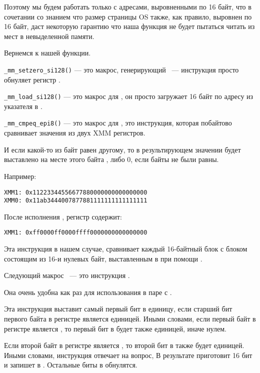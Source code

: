 Поэтому мы будем работать только с адресами, выровненными по 16 байт, что в сочетании со знанием 
что размер страницы \ac{OS} также, как правило, выровнен по 16 байт, 
даст некоторую гарантию что наша функция не будет пытаться читать из мест в невыделенной памяти.

Вернемся к нашей функции.

\verb|_mm_setzero_si128()| --- это макрос, генерирующий  ~--- инструкция просто обнуляет регистр .

\verb|_mm_load_si128()| --- это макрос для \MOVDQA, он просто загружает 16 байт по адресу из указателя в .

\verb|_mm_cmpeq_epi8()| --- это макрос для \PCMPEQB, это инструкция, которая 
побайтово сравнивает значения из двух XMM регистров. 

И если какой-то из байт равен другому, 
то в результирующем значении будет выставлено на месте этого 
байта , либо 0, если байты не были равны.

Например:

\begin{verbatim}
XMM1: 0x11223344556677880000000000000000
XMM0: 0x11ab3444007877881111111111111111
\end{verbatim}

После исполнения , регистр  содержит:

\begin{verbatim}
XMM1: 0xff0000ff0000ffff0000000000000000
\end{verbatim}

Эта инструкция в нашем случае, сравнивает каждый 16-байтный блок с блоком состоящим из 16-и нулевых байт, 
выставленным в  при помощи .

Следующий макрос  ~--- это инструкция .

Она очень удобна как раз для использования в паре с \PCMPEQB.


Эта инструкция выставит самый первый бит \EAX в единицу, если старший бит первого байта в 
регистре  является единицей. 
Иными словами, если первый байт в регистре  является , то первый бит в \EAX будет также единицей, 
иначе нулем.

Если второй байт в регистре  является , то второй бит в \EAX также будет единицей. 
Иными словами, инструкция отвечает на вопрос, 
В результате приготовит 16 бит и запишет в \EAX. Остальные биты в \EAX обнулятся.

